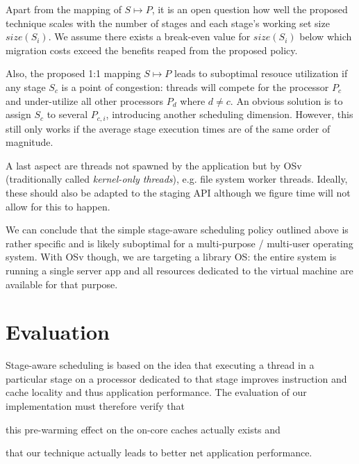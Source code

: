 \documentclass{article}
\begin{document}
Apart from the mapping of $S \mapsto P$, it is an open question how well the proposed technique scales with the number
of stages and each stage's working set size $size(S_i)$.
We assume there exists a break-even value for $size(S_i)$ below which migration costs exceed the benefits reaped from the proposed policy.

Also, the proposed 1:1 mapping $S \mapsto P$ leads to suboptimal resouce utilization if any stage $S_c$ is a point of congestion:
threads will compete for the processor $P_c$ and under-utilize all other processors $P_d$ where $d \ne c$.
An obvious solution is to assign $S_c$ to several $P_{c,i}$, introducing another scheduling dimension.
However, this still only works if the average stage execution times are of the same order of magnitude.

A last aspect are threads not spawned by the application but by OSv (traditionally called \emph{kernel-only threads}),
e.g. file system worker threads.
Ideally, these should also be adapted to the staging API although we figure time will not allow for this to happen.

We can conclude that the simple stage-aware scheduling policy outlined above is rather specific and
is likely suboptimal for a multi-purpose / multi-user operating system.
With OSv though, we are targeting a library OS:
the entire system is running a single server app and all resources dedicated to the virtual machine are available for that purpose.

\section{Evaluation}\label{evaluation}

Stage-aware scheduling is based on the idea that executing a thread in a particular stage on a processor dedicated to
that stage improves instruction and cache locality and thus application performance.
The evaluation of our implementation must therefore verify that
\begin{enumerate*}[label=\emph{(\alph*)}]
    \item this pre-warming effect on the on-core caches actually exists and
    \item that our technique actually leads to better net application performance.
\end{enumerate*}
\end{document}
